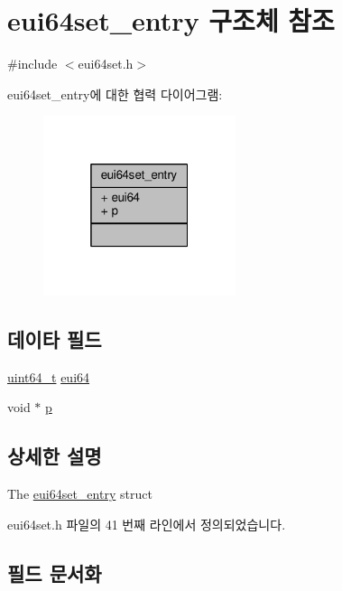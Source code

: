 \hypertarget{structeui64set__entry}{}\section{eui64set\+\_\+entry 구조체 참조}
\label{structeui64set__entry}


{\ttfamily \#include $<$eui64set.\+h$>$}



eui64set\+\_\+entry에 대한 협력 다이어그램\+:
\nopagebreak
\begin{figure}[H]
\begin{center}
\leavevmode
\includegraphics[width=160pt]{structeui64set__entry__coll__graph}
\end{center}
\end{figure}
\subsection*{데이타 필드}
\begin{DoxyCompactItemize}
\item 
\hyperlink{parse_8c_aec6fcb673ff035718c238c8c9d544c47}{uint64\+\_\+t} \hyperlink{structeui64set__entry_a1fcd42f07fb4db9e8b582c788572ed38}{eui64}
\item 
void $\ast$ \hyperlink{structeui64set__entry_a117104b82864d3b23ec174af6d392709}{p}
\end{DoxyCompactItemize}


\subsection{상세한 설명}
The \hyperlink{structeui64set__entry}{eui64set\+\_\+entry} struct 

eui64set.\+h 파일의 41 번째 라인에서 정의되었습니다.



\subsection{필드 문서화}
